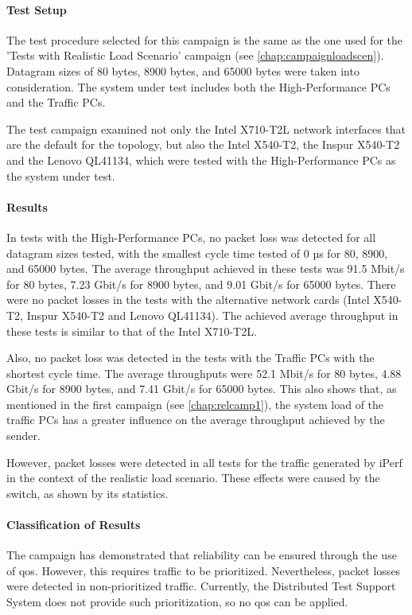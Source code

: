 \paragraph{Test Setup}
The test procedure selected for this campaign is the same as the one used for the 'Tests with Realistic Load Scenario' campaign (see \ref{chap:campaignloadscen}). Datagram sizes of 80 bytes, 8900 bytes, and 65000 bytes were taken into consideration. The system under test includes both the High-Performance PCs and the Traffic PCs.

The test campaign examined not only the Intel X710-T2L network interfaces that are the default for the topology, but also the Intel X540-T2, the Inspur X540-T2 and the Lenovo QL41134, which were tested with the High-Performance PCs as the system under test.

\paragraph{Results}
In tests with the High-Performance PCs, no packet loss was detected for all datagram sizes tested, with the smallest cycle time tested of 0 µs for 80, 8900, and 65000 bytes. The average throughput achieved in these tests was 91.5 Mbit/s for 80 bytes, 7.23 Gbit/s for 8900 bytes, and 9.01 Gbit/s for 65000 bytes. There were no packet losses in the tests with the alternative network cards (Intel X540-T2, Inspur X540-T2 and Lenovo QL41134). The achieved average throughput in these tests is similar to that of the Intel X710-T2L.

Also, no packet loss was detected in the tests with the Traffic PCs with the shortest cycle time. The average throughputs were 52.1 Mbit/s for 80 bytes, 4.88 Gbit/s for 8900 bytes, and 7.41 Gbit/s for 65000 bytes. This also shows that, as mentioned in the first campaign (see \ref{chap:relcamp1}), the system load of the traffic PCs has a greater influence on the average throughput achieved by the sender.

However, packet losses were detected in all tests for the traffic generated by iPerf in the context of the realistic load scenario. These effects were caused by the switch, as shown by its statistics.

\paragraph{Classification of Results}
The campaign has demonstrated that reliability can be ensured through the use of \ac{qos}. However, this requires traffic to be prioritized. Nevertheless, packet losses were detected in non-prioritized traffic. Currently, the Distributed Test Support System does not provide such prioritization, so no \ac{qos} can be applied.

